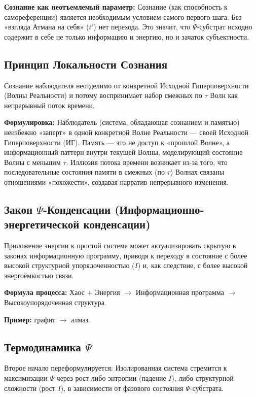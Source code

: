 \documentclass[a4paper,12pt]{article}
\begin{document}
\textbf{Сознание как неотъемлемый параметр:} Сознание (как способность к самореференции) является необходимым условием самого первого шага. Без «взгляда Атмана на себя» ($i^i$) нет перехода. Это значит, что $\Psi$-субстрат исходно содержит в себе не только информацию и энергию, но и зачаток субъектности.

\subsection{Принцип Локальности Сознания}

Сознание наблюдателя неотделимо от конкретной Исходной Гиперповерхности (Волны Реальности) и потому воспринимает набор смежных по $\tau$ Волн как непрерывный поток времени.

\textbf{Формулировка:} Наблюдатель (система, обладающая сознанием и памятью) неизбежно «заперт» в одной конкретной Волне Реальности — своей Исходной Гиперповерхности (ИГ). Память — это не доступ к «прошлой Волне», а информационный паттерн внутри текущей Волны, моделирующий состояние Волны с меньшим $\tau$. Иллюзия потока времени возникает из-за того, что последовательные состояния памяти в смежных (по $\tau$) Волнах связаны отношениями «похожести», создавая нарратив непрерывного изменения.

\subsection{Закон $\Psi$-Конденсации (Информационно-энергетической конденсации)}

Приложение энергии к простой системе может актуализировать скрытую в законах информационную программу, приводя к переходу в состояние с более высокой структурной упорядоченностью ($I$) и, как следствие, с более высокой энергоёмкостью связи.

\textbf{Формула процесса:} Хаос + Энергия $\to$ Информационная программа $\to$ Высокоупорядоченная структура.

\textbf{Пример:} графит $\to$ алмаз.

\subsection{Термодинамика $\Psi$}

Второе начало переформулируется: Изолированная система стремится к максимизации $\Psi$ через рост либо энтропии (падение $I$), либо структурной сложности (рост $I$), в зависимости от фазового состояния $\Psi$-субстрата.
\end{document}
